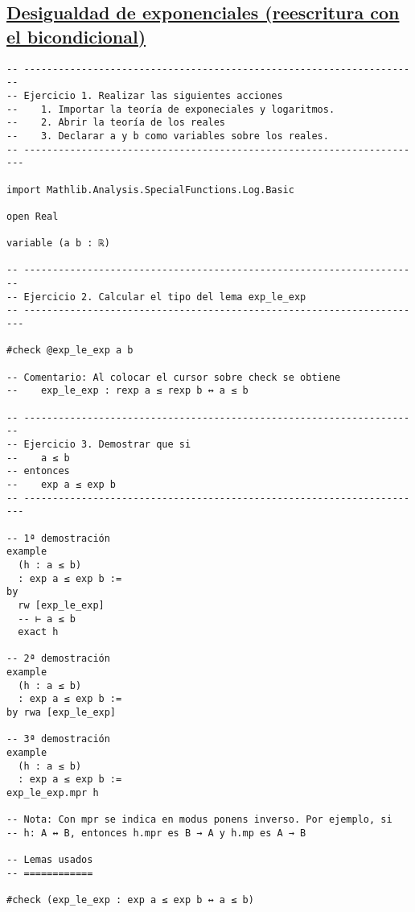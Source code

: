 \subsection{\href{./src/Basicos/Desigualdad\_de\_exponenciales.lean}{Desigualdad de exponenciales (reescritura con el bicondicional)}}
\label{sec:org4039f5f}
\begin{verbatim}
-- ---------------------------------------------------------------------
-- Ejercicio 1. Realizar las siguientes acciones
--    1. Importar la teoría de exponeciales y logaritmos.
--    2. Abrir la teoría de los reales
--    3. Declarar a y b como variables sobre los reales.
-- ----------------------------------------------------------------------

import Mathlib.Analysis.SpecialFunctions.Log.Basic

open Real

variable (a b : ℝ)

-- ---------------------------------------------------------------------
-- Ejercicio 2. Calcular el tipo del lema exp_le_exp
-- ----------------------------------------------------------------------

#check @exp_le_exp a b

-- Comentario: Al colocar el cursor sobre check se obtiene
--    exp_le_exp : rexp a ≤ rexp b ↔ a ≤ b

-- ---------------------------------------------------------------------
-- Ejercicio 3. Demostrar que si
--    a ≤ b
-- entonces
--    exp a ≤ exp b
-- ----------------------------------------------------------------------

-- 1ª demostración
example
  (h : a ≤ b)
  : exp a ≤ exp b :=
by
  rw [exp_le_exp]
  -- ⊢ a ≤ b
  exact h

-- 2ª demostración
example
  (h : a ≤ b)
  : exp a ≤ exp b :=
by rwa [exp_le_exp]

-- 3ª demostración
example
  (h : a ≤ b)
  : exp a ≤ exp b :=
exp_le_exp.mpr h

-- Nota: Con mpr se indica en modus ponens inverso. Por ejemplo, si
-- h: A ↔ B, entonces h.mpr es B → A y h.mp es A → B

-- Lemas usados
-- ============

#check (exp_le_exp : exp a ≤ exp b ↔ a ≤ b)
\end{verbatim}

